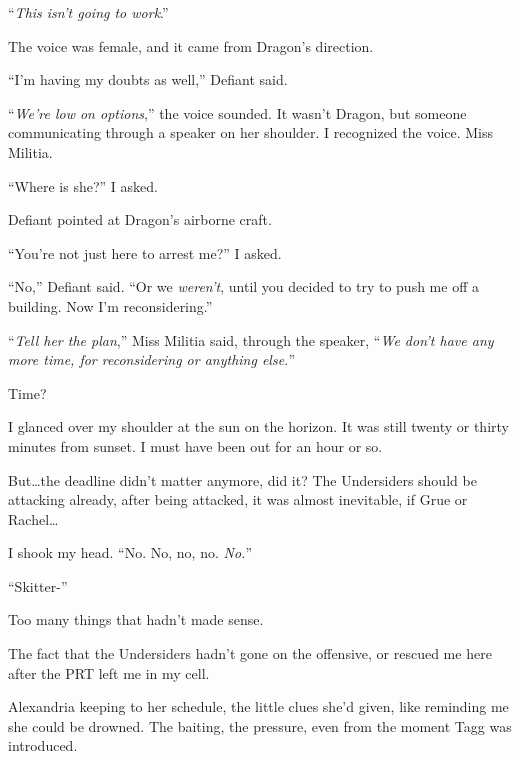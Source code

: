 ``\emph{This isn't going to work}.''



The voice was female, and it came from Dragon's direction.



``I'm having my doubts as well,'' Defiant said.



``\emph{We're low on options},'' the voice sounded.  It wasn't Dragon, but someone communicating through a speaker on her shoulder.  I recognized the voice.  Miss Militia.



``Where is she?'' I asked.



Defiant pointed at Dragon's airborne craft.



``You're not just here to arrest me?'' I asked.



``No,'' Defiant said.  ``Or we \emph{weren't}, until you decided to try to push me off a building.  Now I'm reconsidering.''



``\emph{Tell her the plan},'' Miss Militia said, through the speaker,  ``\emph{We don't have any more time, for reconsidering or anything else.}''



Time?



I glanced over my shoulder at the sun on the horizon.  It was still twenty or thirty minutes from sunset.  I must have been out for an hour or so.



But\ldots the deadline didn't matter anymore, did it?  The Undersiders should be attacking already, after being attacked, it was almost inevitable, if Grue or Rachel\ldots



I shook my head.  ``No.  No, no, no.  \emph{No.}''



``Skitter-''



Too many things that hadn't made sense.



The fact that the Undersiders hadn't gone on the offensive, or rescued me here after the PRT left me in my cell.



Alexandria keeping to her schedule, the little clues she'd given, like reminding me she could be drowned.  The baiting, the pressure, even from the moment Tagg was introduced.



